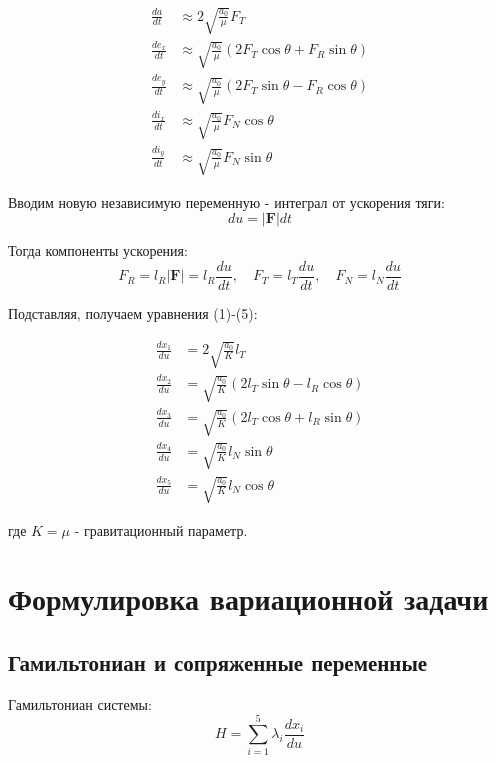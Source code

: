 \documentclass[12pt]{article}
\begin{document}
\begin{align*}
\frac{da}{dt} &\approx 2\sqrt{\frac{a_0}{\mu}} F_T \\
\frac{de_x}{dt} &\approx \sqrt{\frac{a_0}{\mu}} (2F_T \cos \theta + F_R \sin \theta) \\
\frac{de_y}{dt} &\approx \sqrt{\frac{a_0}{\mu}} (2F_T \sin \theta - F_R \cos \theta) \\
\frac{di_x}{dt} &\approx \sqrt{\frac{a_0}{\mu}} F_N \cos \theta \\
\frac{di_y}{dt} &\approx \sqrt{\frac{a_0}{\mu}} F_N \sin \theta
\end{align*}

Вводим новую независимую переменную - интеграл от ускорения тяги:
\begin{equation}
du = |\mathbf{F}| dt
\end{equation}

Тогда компоненты ускорения:
\begin{equation}
F_R = l_R |\mathbf{F}| = l_R \frac{du}{dt}, \quad 
F_T = l_T \frac{du}{dt}, \quad 
F_N = l_N \frac{du}{dt}
\end{equation}

Подставляя, получаем уравнения (1)-(5):

\begin{align}
\frac{dx_1}{du} &= 2\sqrt{\frac{a_0}{K}} l_T \tag{1} \\
\frac{dx_2}{du} &= \sqrt{\frac{a_0}{K}} (2l_T \sin \theta - l_R \cos \theta) \tag{2} \\
\frac{dx_3}{du} &= \sqrt{\frac{a_0}{K}} (2l_T \cos \theta + l_R \sin \theta) \tag{3} \\
\frac{dx_4}{du} &= \sqrt{\frac{a_0}{K}} l_N \sin \theta \tag{4} \\
\frac{dx_5}{du} &= \sqrt{\frac{a_0}{K}} l_N \cos \theta \tag{5}
\end{align}

где $K = \mu$ - гравитационный параметр.

\section{Формулировка вариационной задачи}

\subsection{Гамильтониан и сопряженные переменные}

Гамильтониан системы:
\begin{equation}
H = \sum_{i=1}^5 \lambda_i \frac{dx_i}{du} \tag{6}
\end{equation}
\end{document}
